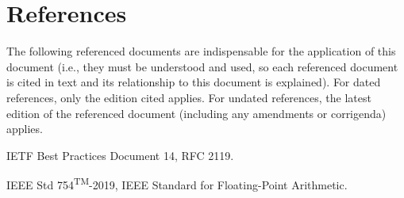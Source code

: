 \chapter{References}

The following referenced documents are indispensable for the application of this document (i.e., they must be understood and used, so each referenced document is cited in text and its relationship to this document is explained).
For dated references, only the edition cited applies.
For undated references, the latest edition of the referenced document (including any amendments or corrigenda) applies.

IETF Best Practices Document 14, RFC 2119.

IEEE Std 754\textsuperscript{TM}-2019, IEEE Standard for Floating-Point Arithmetic.
